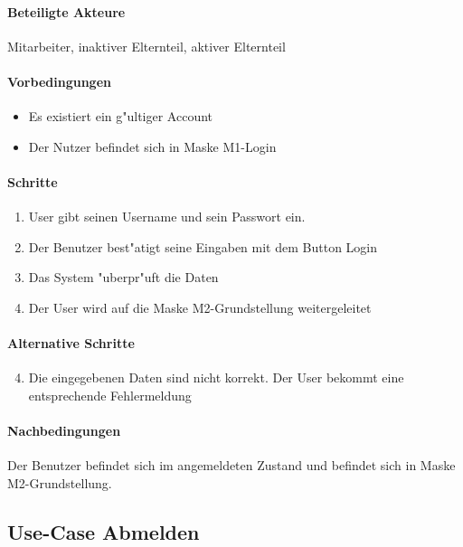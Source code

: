   \paragraph{Beteiligte Akteure}   \leavevmode \newline
    Mitarbeiter, inaktiver Elternteil, aktiver Elternteil
  \paragraph{Vorbedingungen}
  \begin{itemize}
   \item Es existiert ein g"ultiger Account
   \item Der Nutzer befindet sich in Maske M1-Login
  \end{itemize}

  \paragraph{Schritte}
  \begin{enumerate}
   \item User gibt seinen Username und sein Passwort ein.
   \item Der Benutzer best"atigt seine Eingaben mit dem Button \dq Login\dq
   \item Das System "uberpr"uft die Daten
   \item Der User wird auf die Maske M2-Grundstellung weitergeleitet
  \end{enumerate}

  \paragraph{Alternative Schritte}
  \begin{enumerate}
   \setcounter{enumi}{3}
   \item Die eingegebenen Daten sind nicht korrekt. Der User bekommt eine entsprechende Fehlermeldung
  \end{enumerate}

  \paragraph{Nachbedingungen}
    Der Benutzer befindet sich im angemeldeten Zustand und befindet sich in Maske M2-Grundstellung.

  
 \newpage
 \subsection{Use-Case Abmelden}

